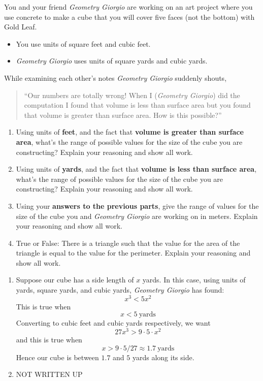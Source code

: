 \documentclass[handout,nooutcomes,noauthor,12pt]{ximera}
\begin{document}
\begin{question}
  You and your friend \textit{Geometry Giorgio} are working on an art
  project where you use concrete to make a cube that you will cover
  five faces (not the bottom) with Gold Leaf.
  \begin{itemize}
  \item You use units of square feet and cubic feet.
  \item \textit{Geometry Giorgio} uses units of square yards and cubic
    yards.
  \end{itemize}
  While examining each other's notes \textit{Geometry Giorgio}
  suddenly shouts,
  \begin{quote}
    ``Our numbers are totally wrong! When I (\textit{Geometry Giorgio})
    did the computation I found that volume is less than surface area
    but you found that volume is greater than surface area.  How is
    this possible?''
  \end{quote}
  \begin{enumerate}
  \item Using units of \textbf{feet}, and the fact that \textbf{volume
    is greater than surface area}, what's the range of possible values
    for the size of the cube you are constructing? Explain your
    reasoning and show all work.
  \item Using units of \textbf{yards}, and the fact that \textbf{volume is
    less than surface area}, what's the range of possible values for the
    size of the cube you are constructing? Explain your reasoning and
    show all work.
  \item Using your \textbf{answers to the previous parts}, give the range of
    values for the size of the cube you and \textit{Geometry Giorgio}
    are working on in meters.  Explain your reasoning and
    show all work.
  \item True or False: There is a triangle such that the value for the
    area of the triangle is equal to the value for the
    perimeter. Explain your reasoning and show all work.
  \end{enumerate}
  \begin{freeResponse}
    \begin{enumerate}
    \item Suppose our cube has a side length of $x$ yards. In this
      case, using units of yards, square yards, and cubic yards,
      \textit{Geometry Giorgio} has found:
      \[
      x^3 < 5x^2
      \]
      This is true when
      \[
      x<5~\text{yards}
      \]
      Converting to cubic feet and cubic yards respectively, we want
      \[
      27x^3 > 9\cdot 5\cdot x^2
      \]
      and this is true when
      \[
      x > 9\cdot 5/27 \approx 1.7~\text{yards}
      \]
      Hence our cube is between $1.7$ and $5$ yards along its side.
    \item NOT WRITTEN UP
    \end{enumerate}
  \end{freeResponse}
\end{question}
\end{document}

